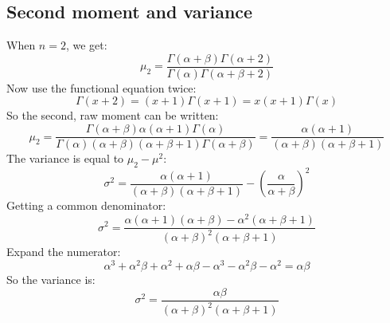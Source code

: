 \documentclass[12pt, a4paper]{article}
\begin{document}
\subsection{Second moment and variance}
When $n=2$, we get:
\begin{equation}
\mu_2=\frac{\Gamma(\alpha+\beta)\Gamma(\alpha+2)}{\Gamma(\alpha)\Gamma(\alpha+\beta+2)}
\end{equation}
Now use the functional equation twice:
\begin{equation}
\Gamma(x+2)=(x+1)\Gamma(x+1)=x(x+1)\Gamma(x)
\end{equation}
So the second, raw moment can be written:
\begin{equation}
\mu_2=\frac{\Gamma(\alpha+\beta)\alpha(\alpha+1)\Gamma(\alpha)}{\Gamma(\alpha)(\alpha+\beta)(\alpha+\beta+1)\Gamma(\alpha+\beta)}=\frac{\alpha(\alpha+1)}{(\alpha+\beta)(\alpha+\beta+1)}
\end{equation}
The variance is equal to $\mu_2-\mu^2$:
\begin{equation}
\sigma^2=\frac{\alpha(\alpha+1)}{(\alpha+\beta)(\alpha+\beta+1)}-\left(\frac{\alpha}{\alpha+\beta}\right)^2
\end{equation}
Getting a common denominator:
\begin{equation}
\sigma^2=\frac{\alpha(\alpha+1)(\alpha+\beta)-\alpha^2(\alpha+\beta+1)}{(\alpha+\beta)^2(\alpha+\beta+1)}
\end{equation}
Expand the numerator:
\begin{equation}
\alpha^3+\alpha^2\beta+\alpha^2+\alpha\beta-\alpha^3-\alpha^2\beta-\alpha^2=\alpha\beta
\end{equation}
So the variance is:
\begin{equation}
\sigma^2=\frac{\alpha\beta}{(\alpha+\beta)^2(\alpha+\beta+1)}
\end{equation}
\end{document}
